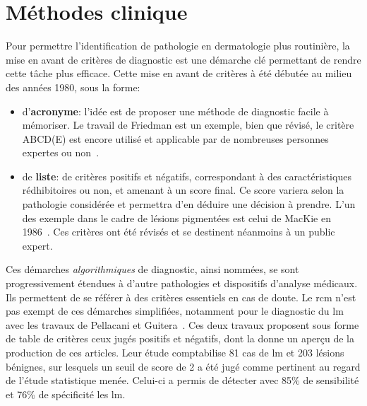 \section{Méthodes clinique}
\label{sec:clinical_methods}
Pour permettre l'identification de pathologie en dermatologie plus routinière, la mise en avant de critères de diagnostic est une démarche clé permettant de rendre cette tâche plus efficace. Cette mise en avant de critères à été débutée au milieu des années 1980, sous la forme:
\begin{itemize}
    \item d'\textbf{acronyme}: l'idée est de proposer une méthode de diagnostic facile à mémoriser. Le travail de Friedman est un exemple, bien que révisé, le critère ABCD(E) est encore utilisé et applicable par de nombreuses personnes expertes ou non~\cite{Friedman1985}.
    \item de \textbf{liste}: de critères positifs et négatifs, correspondant à des caractéristiques rédhibitoires ou non, et amenant à un score final. Ce score variera selon la pathologie considérée et permettra d'en déduire une décision à prendre. L'un des exemple dans le cadre de lésions pigmentées est celui de MacKie en 1986~\cite{mackie1986}. Ces critères ont été révisés et se destinent néanmoins à un public expert. 
\end{itemize}\par

Ces démarches \textit{algorithmiques} de diagnostic, ainsi nommées, se sont progressivement étendues à d'autre pathologies et dispositifs d'analyse médicaux. Ils permettent de se référer à des critères essentiels en cas de doute. Le \gls{rcm} n'est pas exempt de ces démarches simplifiées, notamment pour le diagnostic du \gls{lm} avec les travaux de Pellacani et Guitera~\cite{Pellacani2007, Guitera2010}. Ces deux travaux proposent sous forme de table de critères ceux jugés positifs et négatifs, dont la  donne un aperçu de la production de ces articles. Leur étude comptabilise 81 cas de \gls{lm} et 203 lésions bénignes, sur lesquels un seuil de score de 2 a été jugé comme pertinent au regard de l'étude statistique menée. Celui-ci a permis de détecter avec 85\% de sensibilité et 76\% de spécificité les \gls{lm}.\par


